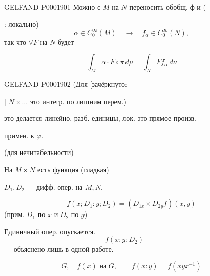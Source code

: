 \begin{GelfandAdjacentEvidence}{GELFAND-P000190}{1}
Можно с $M$ на $N$ переносить обобщ. ф-и
(
\end{GelfandAdjacentEvidence}
: локально)
\begin{equation*}
\alpha\in C_0^\infty(M)\quad\longrightarrow\quad f_\alpha\in C_0^\infty(N),
\end{equation*}
так что $\forall F$ на $N$ будет



\begin{equation*}
\int_M\alpha\cdot F\circ\pi\,d\mu=\int_N Ff_\alpha\,d\nu
\end{equation*}



\begin{GelfandAdjacentEvidence}{GELFAND-P000190}{2}
(Для [зачёркнуто: 
\end{GelfandAdjacentEvidence}
]
$N\times\ldots$ это интегр. по лишним перем.)

это делается линейно, разб. единицы, лок. это
прямое произв.





 примен. к $\varphi$.



 (для нечитабельности)



На $M\times N$ есть функция (гладкая)

$D_1,D_2$ — дифф. опер. на $M,N$.



\begin{equation*}
f(x;D_1:y;D_2)=(D_{1x}\times D_{2y}f)(x,y)
\end{equation*}
(прим. $D_1$ по $x$ и $D_2$ по $y$)



Единичный опер. опускается.
\begin{equation*}
f(x:y;D_2)\quad\text{—}
\end{equation*}
— объяснено лишь в одной работе.



\begin{equation*}
G,\quad f(x)\text{ на }G,\qquad f(x:y)=f(xyx^{-1})
\end{equation*}



